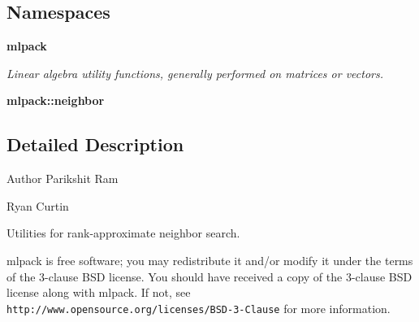 \subsection*{Namespaces}
\begin{DoxyCompactItemize}
\item 
 \textbf{ mlpack}
\begin{DoxyCompactList}\small\item\em Linear algebra utility functions, generally performed on matrices or vectors. \end{DoxyCompactList}\item 
 \textbf{ mlpack\+::neighbor}
\end{DoxyCompactItemize}


\subsection{Detailed Description}
\begin{DoxyAuthor}{Author}
Parikshit Ram 

Ryan Curtin
\end{DoxyAuthor}
Utilities for rank-\/approximate neighbor search.

mlpack is free software; you may redistribute it and/or modify it under the terms of the 3-\/clause B\+SD license. You should have received a copy of the 3-\/clause B\+SD license along with mlpack. If not, see {\tt http\+://www.\+opensource.\+org/licenses/\+B\+S\+D-\/3-\/\+Clause} for more information. 